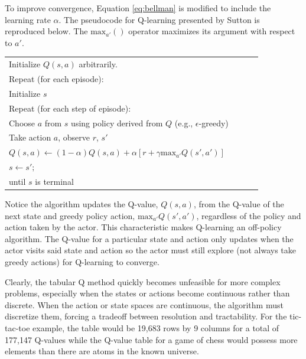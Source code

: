 To improve convergence, Equation \ref{eq:bellman} is modified to include the learning rate $\alpha$. The pseudocode for Q-learning presented by Sutton is reproduced below. The $\text{max}_{a'}()$ operator maximizes its argument with respect to $a'$.
\begin{center} \begin{tabular}{|p{0.9\linewidth}|}\hline %
Initialize $Q(s,a)$ arbitrarily. \\
Repeat (for each episode): \\
\qquad Initialize $s$\\
\qquad Repeat (for each step of episode):\\
\qquad \qquad Choose $a$ from $s$ using policy derived from $Q$ (e.g., $\epsilon$-greedy)\\
\qquad \qquad Take action $a$, observe $r$, $s'$\\
\qquad \qquad $Q(s,a)\gets (1-\alpha)Q(s,a) + \alpha [r + \gamma \text{max}_{a'}Q(s',a')]$\\
\qquad \qquad $s \gets s';$\\
\qquad until $s$ is terminal \\
\hline
\end{tabular} \end{center}
Notice the algorithm updates the Q-value, $Q(s,a)$, from the Q-value of the next state and greedy policy action, $\text{max}_{a'}Q(s',a')$, regardless of the policy and action taken by the actor. This characteristic makes Q-learning an off-policy algorithm. The Q-value for a particular state and action only updates when the actor visits said state and action so the actor must still explore (not always take greedy actions) for Q-learning to converge.

Clearly, the tabular Q method quickly becomes unfeasible for more complex problems, especially when the states or actions become continuous rather than discrete. When the action or state spaces are continuous, the algorithm must discretize them, forcing a tradeoff between resolution and tractability. For the tic-tac-toe example, the table would be 19,683 rows by 9 columns for a total of 177,147 Q-values while the Q-value table for a game of chess would possess more elements than there are atoms in the known universe.

